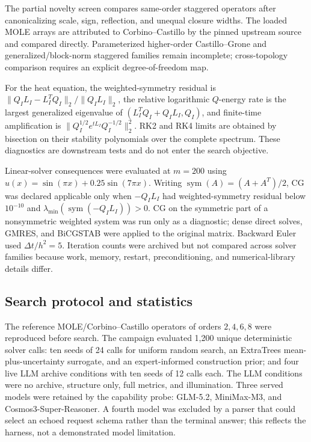 \documentclass[lineno,pdflatex,sn-nature]{sn-jnl}
\theoremstyle{thmstyleone}
\begin{document}
The partial novelty screen compares same-order staggered operators after canonicalizing scale, sign, reflection, and unequal closure widths. The loaded MOLE arrays are attributed to Corbino--Castillo by the pinned upstream source and compared directly. Parameterized higher-order Castillo--Grone and generalized/block-norm staggered families remain incomplete; cross-topology comparison requires an explicit degree-of-freedom map.

For the heat equation, the weighted-symmetry residual is $\lVert Q_IL_I-L_I^TQ_I\rVert_2/\lVert Q_IL_I\rVert_2$, the relative logarithmic $Q$-energy rate is the largest generalized eigenvalue of $(L_I^TQ_I+Q_IL_I,Q_I)$, and finite-time amplification is $\lVert Q_I^{1/2}e^{tL_I}Q_I^{-1/2}\rVert_2^2$. RK2 and RK4 limits are obtained by bisection on their stability polynomials over the complete spectrum. These diagnostics are downstream tests and do not enter the search objective.

Linear-solver consequences were evaluated at $m=200$ using $u(x)=\sin(\pi x)+0.25\sin(7\pi x)$. Writing $\operatorname{sym}(A)=(A+A^T)/2$, CG was declared applicable only when $-Q_IL_I$ had weighted-symmetry residual below $10^{-10}$ and $\lambda_{\min}(\operatorname{sym}(-Q_IL_I))>0$. CG on the symmetric part of a nonsymmetric weighted system was run only as a diagnostic; dense direct solves, GMRES, and BiCGSTAB were applied to the original matrix. Backward Euler used $\Delta t/h^2=5$. Iteration counts were archived but not compared across solver families because work, memory, restart, preconditioning, and numerical-library details differ.

\subsection{Search protocol and statistics}
The reference MOLE/Corbino--Castillo operators of orders $2,4,6,8$ were reproduced before search. The campaign evaluated 1,200 unique deterministic solver calls: ten seeds of 24 calls for uniform random search, an ExtraTrees mean-plus-uncertainty surrogate, and an expert-informed construction prior; and four live LLM archive conditions with ten seeds of 12 calls each. The LLM conditions were no archive, structure only, full metrics, and illumination. Three served models were retained by the capability probe: GLM-5.2, MiniMax-M3, and Cosmos3-Super-Reasoner. A fourth model was excluded by a parser that could select an echoed request schema rather than the terminal answer; this reflects the harness, not a demonstrated model limitation.
\end{document}
